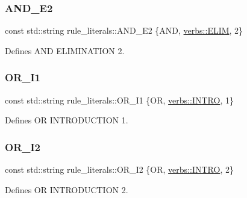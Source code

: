 \subsubsection{\texorpdfstring{A\+N\+D\+\_\+\+E2}{AND\_E2}}
{\footnotesize\ttfamily const std\+::string rule\+\_\+literals\+::\+A\+N\+D\+\_\+\+E2 \{A\+ND, \mbox{\hyperlink{namespaceverbs_ae28355cc9321ebee9abcd23bb6e1b836}{verbs\+::\+E\+L\+IM}}, \textquotesingle{}2\textquotesingle{}\}}



Defines A\+ND E\+L\+I\+M\+I\+N\+A\+T\+I\+ON 2. 

\mbox{\label{namespacerule__literals_a0c61940a6e12e4ea3a41346b5b3c5870}} 
\subsubsection{\texorpdfstring{O\+R\+\_\+\+I1}{OR\_I1}}
{\footnotesize\ttfamily const std\+::string rule\+\_\+literals\+::\+O\+R\+\_\+\+I1 \{OR, \mbox{\hyperlink{namespaceverbs_a160cd2b49b96eb11b6db907bf94b5c3a}{verbs\+::\+I\+N\+T\+RO}}, \textquotesingle{}1\textquotesingle{}\}}



Defines OR I\+N\+T\+R\+O\+D\+U\+C\+T\+I\+ON 1. 

\mbox{\label{namespacerule__literals_a2c1ef10ddec67801c44ea5b3e15ed133}} 
\subsubsection{\texorpdfstring{O\+R\+\_\+\+I2}{OR\_I2}}
{\footnotesize\ttfamily const std\+::string rule\+\_\+literals\+::\+O\+R\+\_\+\+I2 \{OR, \mbox{\hyperlink{namespaceverbs_a160cd2b49b96eb11b6db907bf94b5c3a}{verbs\+::\+I\+N\+T\+RO}}, \textquotesingle{}2\textquotesingle{}\}}



Defines OR I\+N\+T\+R\+O\+D\+U\+C\+T\+I\+ON 2. 

\mbox{\label{namespacerule__literals_a51a002ead2192c49b9c6216c5fbe3b74}} 

